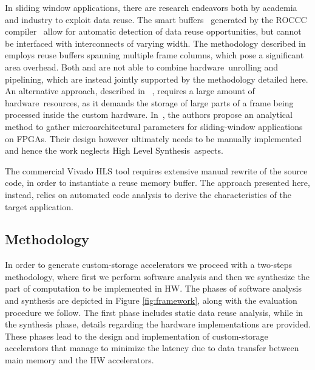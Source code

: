 \documentclass[]{usiinfthesis}
\newcommand{\HW}{{hardware}}
\newcommand{\HLS}{{High Level Synthesis}}
\begin{document}
In sliding window applications, there are research endeavors
both by academia and industry to exploit data reuse. The smart
buffers~\cite{GuoJun04} generated by the ROCCC
compiler~\cite{VillarrealMay10} allow for automatic detection of data
reuse opportunities, but cannot be interfaced 
with interconnects of varying width.
The methodology
described in \cite{MeeusMar14} employs reuse buffers spanning multiple
frame columns, which pose a significant area
overhead. Both \cite{GuoJun04} and \cite{MeeusMar14} are not able
to combine \HW\ unrolling and pipelining, which are instead jointly
supported by the methodology detailed here. An alternative 
approach, described in
~\cite{DongMar07}, requires a large amount of \HW\ resources, as it 
demands the storage of large parts of a frame being processed inside the custom
hardware.  In~\cite{LeeserApr06}, the authors propose an analytical
method to gather microarchitectural parameters for sliding-window
applications on FPGAs. Their design however ultimately needs to be
manually implemented and hence the work neglects \HLS\ aspects.\par
%
The commercial Vivado HLS tool requires
extensive manual rewrite of the source code, in order to instantiate
a reuse memory buffer. The approach presented 
here, instead, relies on automated code
analysis to derive the characteristics of the target application.\par 



\subsection{Methodology}
\label{sec:dr_meth}

In order to generate custom-storage accelerators we proceed with a
two-steps methodology, where first we perform software analysis and 
then we synthesize the part of computation to be implemented in HW. The phases
of software analysis and synthesis are
depicted in Figure 
\ref{fig:framework}, 
along with the evaluation
procedure we follow. 
The first phase includes static data reuse analysis, while
in the synthesis phase, details regarding the hardware implementations are provided.
These phases lead to the design and implementation of 
custom-storage accelerators that manage to minimize the latency due to data 
transfer between main memory and the HW accelerators.
\end{document}
